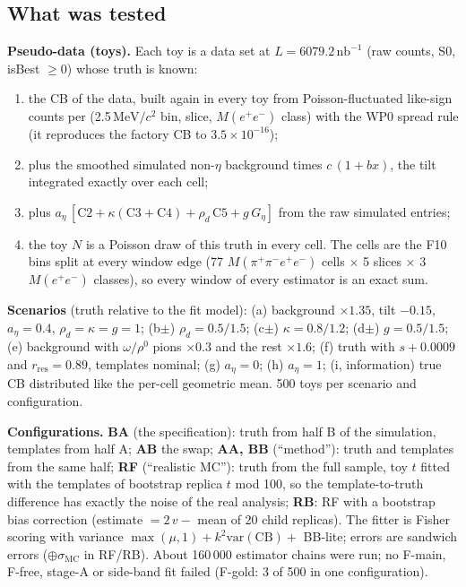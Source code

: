 \documentclass[11pt,a4paper]{article}
\newcommand{\Mfour}{\ensuremath{M(\pi^{+}\pi^{-}e^{+}e^{-})}\xspace}
\newcommand{\Mee}{\ensuremath{M(e^{+}e^{-})}\xspace}
\newcommand{\nbinv}{\ensuremath{\mathrm{nb}^{-1}}\xspace}
\newcommand{\MeVcc}{\ensuremath{\mathrm{MeV}/c^{2}}\xspace}
\newcommand{\aEta}{\ensuremath{a_\eta}\xspace}
\newcommand{\rhod}{\ensuremath{\rho_d}\xspace}
\newcommand{\Geta}{\ensuremath{G_\eta}\xspace}
\begin{document}
\subsection{What was tested}
\textbf{Pseudo-data (toys).} Each toy is a data set at $L=6079.2\,\nbinv$ (raw counts, S0, isBest $\ge0$) whose truth is known:
\begin{enumerate}\setlength{\itemsep}{0pt}
\item the CB of the data, built again in every toy from Poisson-fluctuated like-sign counts per (2.5\,\MeVcc bin, slice, \Mee class) with
      the WP0 spread rule (it reproduces the factory CB to $3.5\times10^{-16}$);
\item plus the smoothed simulated non-$\eta$ background times $c\,(1+bx)$, the tilt integrated exactly over each cell;
\item plus $\aEta\,[\mathrm{C2}+\kappa(\mathrm{C3}+\mathrm{C4})+\rhod\,\mathrm{C5}+g\,\Geta]$ from the raw simulated entries;
\item the toy $N$ is a Poisson draw of this truth in every cell. The cells are the F10 bins split at every window edge (77 \Mfour cells
      $\times$ 5 slices $\times$ 3 \Mee classes), so every window of every estimator is an exact sum.
\end{enumerate}
\textbf{Scenarios} (truth relative to the fit model): (a) background $\times1.35$, tilt $-0.15$, $\aEta=0.4$, $\rhod=\kappa=g=1$;
(b$\pm$) $\rhod=0.5/1.5$; (c$\pm$) $\kappa=0.8/1.2$; (d$\pm$) $g=0.5/1.5$; (e) background with $\omega/\rho^0$ pions $\times0.3$ and the rest
$\times1.6$; (f) truth with $s+0.0009$ and $r_{\mathrm{res}}=0.89$, templates nominal; (g) $\aEta=0$; (h) $\aEta=1$; (i, information) true CB
distributed like the per-cell geometric mean. 500 toys per scenario and configuration.

\textbf{Configurations.} \textbf{BA} (the specification): truth from half B of the simulation, templates from half A; \textbf{AB} the swap;
\textbf{AA, BB} (``method''): truth and templates from the same half; \textbf{RF} (``realistic MC''): truth from the full sample, toy $t$
fitted with the templates of bootstrap replica $t$ mod 100, so the template-to-truth difference has exactly the noise of the real analysis;
\textbf{RB}: RF with a bootstrap bias correction (estimate $=2\,v-$ mean of 20 child replicas). The fitter is Fisher scoring with
variance $\max(\mu,1)+k^2\mathrm{var(CB)}+$ BB-lite; errors are sandwich errors ($\oplus\sigma_{\mathrm{MC}}$ in RF/RB). About 160\,000
estimator chains were run; no F-main, F-free, stage-A or side-band fit failed (F-gold: 3 of 500 in one configuration).
\end{document}
